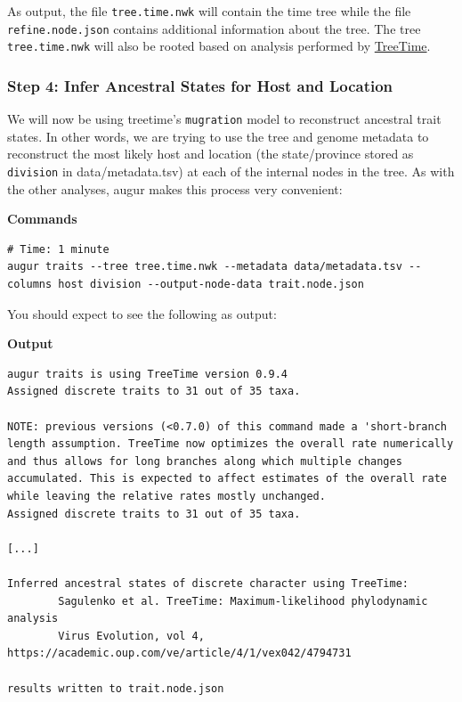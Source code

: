 \documentclass[
]{book}
\begin{document}
As output, the file \texttt{tree.time.nwk} will contain the time tree while the file \texttt{refine.node.json} contains additional information about the tree. The tree \texttt{tree.time.nwk} will also be rooted based on analysis performed by \href{https://treetime.readthedocs.io/en/latest/}{TreeTime}.

\subsubsection{Step 4: Infer Ancestral States for Host and Location}\label{step-4-infer-ancestral-states-for-host-and-location}

We will now be using treetime's \texttt{mugration} model to reconstruct ancestral trait states. In other words, we are trying to use the tree and genome metadata to reconstruct the most likely host and location (the state/province stored as \texttt{division} in data/metadata.tsv) at each of the internal nodes in the tree. As with the other analyses, augur makes this process very convenient:

\textbf{Commands}

\begin{verbatim}
# Time: 1 minute
augur traits --tree tree.time.nwk --metadata data/metadata.tsv --columns host division --output-node-data trait.node.json
\end{verbatim}

You should expect to see the following as output:

\textbf{Output}

\begin{verbatim}
augur traits is using TreeTime version 0.9.4
Assigned discrete traits to 31 out of 35 taxa.

NOTE: previous versions (<0.7.0) of this command made a 'short-branch
length assumption. TreeTime now optimizes the overall rate numerically
and thus allows for long branches along which multiple changes
accumulated. This is expected to affect estimates of the overall rate
while leaving the relative rates mostly unchanged.
Assigned discrete traits to 31 out of 35 taxa.

[...]

Inferred ancestral states of discrete character using TreeTime:
        Sagulenko et al. TreeTime: Maximum-likelihood phylodynamic analysis
        Virus Evolution, vol 4, https://academic.oup.com/ve/article/4/1/vex042/4794731

results written to trait.node.json
\end{verbatim}
\end{document}
